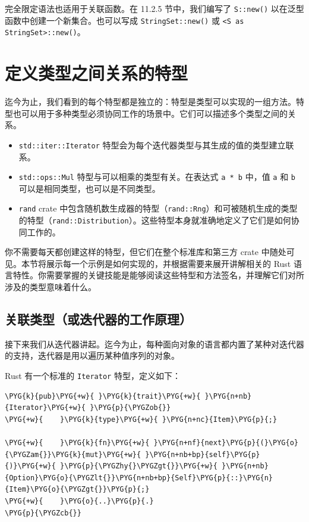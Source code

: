 完全限定语法也适用于关联函数。在 11.2.5 节中，我们编写了 \texttt{S::new()} 以在泛型函数中创建一个新集合。也可以写成 \texttt{StringSet::new()} 或 \texttt{<S as StringSet>::new()}。

\section{定义类型之间关系的特型}

迄今为止，我们看到的每个特型都是独立的：特型是类型可以实现的一组方法。特型也可以用于多种类型必须协同工作的场景中。它们可以描述多个类型之间的关系。

\begin{itemize}
\item \texttt{std::iter::Iterator} 特型会为每个迭代器类型与其生成的值的类型建立联系。
\item \texttt{std::ops::Mul} 特型与可以相乘的类型有关。在表达式 \texttt{a * b} 中，值 \texttt{a} 和 \texttt{b} 可以是相同类型，也可以是不同类型。
\item \texttt{rand} crate 中包含随机数生成器的特型（\texttt{rand::Rng}）和可被随机生成的类型的特型（\texttt{rand::Distribution}）。这些特型本身就准确地定义了它们是如何协同工作的。
\end{itemize}

你不需要每天都创建这样的特型，但它们在整个标准库和第三方 crate 中随处可见。本节将展示每一个示例是如何实现的，并根据需要来展开讲解相关的 Rust 语言特性。你需要掌握的关键技能是能够阅读这些特型和方法签名，并理解它们对所涉及的类型意味着什么。

\subsection{关联类型（或迭代器的工作原理）}

接下来我们从迭代器讲起。迄今为止，每种面向对象的语言都内置了某种对迭代器的支持，迭代器是用以遍历某种值序列的对象。

Rust 有一个标准的 \texttt{Iterator} 特型，定义如下：

\begin{Verbatim}[commandchars=\\\{\},breaklines=true,breakanywhere=true,fontsize=\codefont,xleftmargin=17bp]
\PYG{k}{pub}\PYG{+w}{ }\PYG{k}{trait}\PYG{+w}{ }\PYG{n+nb}{Iterator}\PYG{+w}{ }\PYG{p}{\PYGZob{}}
\PYG{+w}{    }\PYG{k}{type}\PYG{+w}{ }\PYG{n+nc}{Item}\PYG{p}{;}

\PYG{+w}{    }\PYG{k}{fn}\PYG{+w}{ }\PYG{n+nf}{next}\PYG{p}{(}\PYG{o}{\PYGZam{}}\PYG{k}{mut}\PYG{+w}{ }\PYG{n+nb+bp}{self}\PYG{p}{)}\PYG{+w}{ }\PYG{p}{\PYGZhy{}\PYGZgt{}}\PYG{+w}{ }\PYG{n+nb}{Option}\PYG{o}{\PYGZlt{}}\PYG{n+nb+bp}{Self}\PYG{p}{::}\PYG{n}{Item}\PYG{o}{\PYGZgt{}}\PYG{p}{;}
\PYG{+w}{    }\PYG{o}{..}\PYG{p}{.}
\PYG{p}{\PYGZcb{}}
\end{Verbatim}

